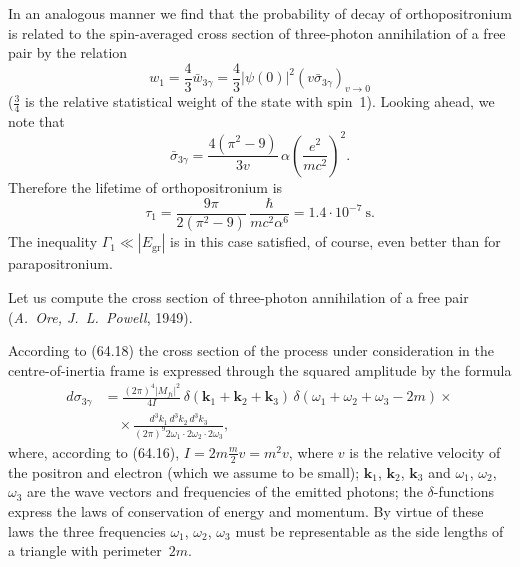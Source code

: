 
In an analogous manner we find that the probability of decay of orthopositronium is related to the spin-averaged cross section of three-photon annihilation of a free pair by the relation
\begin{equation}
w_1 = \frac{4}{3}\bar{w}_{3\gamma} = \frac{4}{3}|\psi(0)|^2(v\bar{\sigma}_{3\gamma})_{v\to 0}
\label{eq:89.5}
\end{equation}
($\frac{3}{4}$ is the relative statistical weight of the state with spin~1). Looking ahead, we note that
\begin{equation}
\bar{\sigma}_{3\gamma} = \frac{4(\pi^2-9)}{3v}\,\alpha\left(\frac{e^2}{mc^2}\right)^{\!2}.
\label{eq:89.6}
\end{equation}
Therefore the lifetime of orthopositronium is
\begin{equation}
\tau_1 = \frac{9\pi}{2(\pi^2-9)}\,\frac{\hbar}{mc^2\alpha^6} = 1.4 \cdot 10^{-7}~\text{s}.
\label{eq:89.7}
\end{equation}
The inequality $\Gamma_1 \ll |E_\text{gr}|$ is in this case satisfied, of course, even better than for parapositronium.

Let us compute the cross section of three-photon annihilation of a free pair (\emph{A.~Ore, J.~L.~Powell}, 1949).

According to (64.18) the cross section of the process under consideration in the centre-of-inertia frame is expressed through the squared amplitude by the formula
\begin{equation}
\begin{split}
d\sigma_{3\gamma} &= \frac{(2\pi)^4|M_{fi}|^2}{4I}\,\delta(\mathbf{k}_1 + \mathbf{k}_2 + \mathbf{k}_3)\,\delta(\omega_1 + \omega_2 + \omega_3 - 2m) \times {} \\
&\quad \times \frac{d^3k_1\,d^3k_2\,d^3k_3}{(2\pi)^9 2\omega_1 \cdot 2\omega_2 \cdot 2\omega_3},
\end{split}
\label{eq:89.8}
\end{equation}
where, according to (64.16), $I = 2m\frac{m}{2}v = m^2 v$, where $v$ is the relative velocity of the positron and electron (which we assume to be small); $\mathbf{k}_1$, $\mathbf{k}_2$, $\mathbf{k}_3$ and $\omega_1$, $\omega_2$, $\omega_3$ are the wave vectors and frequencies of the emitted photons; the $\delta$-functions express the laws of conservation of energy and momentum. By virtue of these laws the three frequencies $\omega_1$, $\omega_2$, $\omega_3$ must be representable as the side lengths of a triangle with perimeter~$2m$.

